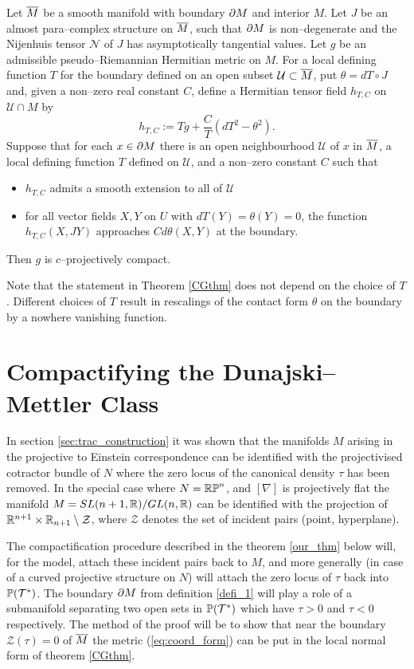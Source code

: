\begin{theo}[\cite{CG}] \label{CGthm}
Let $\overline{M}$ be a smooth manifold with boundary $\partial M$ and interior $M$. Let $J$ be an almost para--complex structure on $\overline{M}$, such that $\partial M$ is non--degenerate and the Nijenhuis tensor $\mathcal{N}$ of $J$ has asymptotically tangential values. Let $g$ be an admissible pseudo--Riemannian Hermitian metric on $M$. For a local defining function $T$ for the boundary defined on an open 
subset ${\mathcal U}\subset \overline{M}$, put $\theta=dT\circ J$ and, given a non--zero real 
constant $C$, define a Hermitian tensor field $h_{T,C}$ on 
${\mathcal U}\cap M$ by
\[
h_{T,C}:=Tg+\frac{C}{T}(dT^2-\theta^2).
\]
Suppose that for each $x\in\partial M$ there is an open neighbourhood 
${\mathcal{U}}$ of $x$ in $\overline{M}$, a local defining function $T$ defined on 
${\mathcal{U}}$, and a non--zero constant $C$ such that
\begin{itemize}
\item $h_{T,C}$ admits a smooth extension to all of $\mathcal{U}$
\item for all vector fields $X,Y$ on $U$ with $dT(Y)=\theta(Y)=0$, the function $h_{T,C}(X,JY)$ approaches $Cd\theta(X,Y)$ at the boundary.
\end{itemize}
Then $g$ is $c$--projectively compact.
\end{theo}
Note that the statement in  Theorem \ref{CGthm} does not depend on the choice of $T$. Different choices of $T$ result in rescalings of the contact form $\theta$ on the boundary by a nowhere vanishing function.


\section{Compactifying the Dunajski--Mettler Class} 

In section \ref{sec:trac_construction} it was shown that the manifolds $M$ arising in the projective to Einstein correspondence can be identified with the projectivised cotractor bundle of $N$ where the zero locus of the canonical density $\tau$ has been removed. In the special case where $N=\mathbb{RP}^n$, and $[\nabla]$ is projectively flat the manifold $M=SL(n+1, \mathbb{R})/GL(n, \mathbb{R})$ can be identified with the projection of $\mathbb{R}^{n+1}\times \mathbb{R}_{n+1}\setminus {\mathcal Z}$, where ${\mathcal Z}$ denotes the set of incident pairs (point, hyperplane). 

The compactification procedure described in  
the theorem \ref{our_thm} below will, for the model, attach these incident pairs back to $M$, and more generally (in case of a curved projective structure on $N$) will attach the zero locus of $\tau$ back into $\mathbb{P}(\mathcal{T}^*)$. The boundary $\partial M$ from definition \ref{defi_1} will play a role of a submanifold
separating two open sets in $\mathbb{P}(\mathcal{T}^*)$ which have $\tau>0$ and $\tau<0$ respectively. The method of the proof will be to show that near
the boundary ${\mathcal{Z}}(\tau)=0$ of $\overline{M}$ the metric 
(\ref{eq:coord_form}) can be put in the local normal form of theorem 
\ref{CGthm}.

